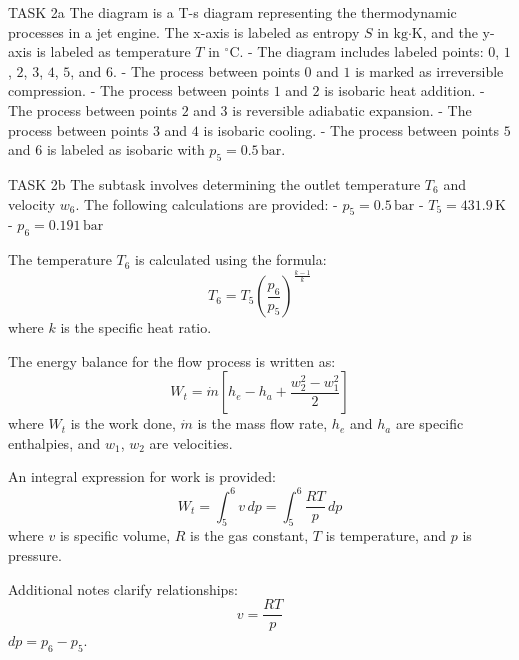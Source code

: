 TASK 2a  
The diagram is a T-s diagram representing the thermodynamic processes in a jet engine. The x-axis is labeled as entropy \( S \) in \( \text{kg·K} \), and the y-axis is labeled as temperature \( T \) in \( ^\circ\text{C} \).  
- The diagram includes labeled points: \( 0 \), \( 1 \), \( 2 \), \( 3 \), \( 4 \), \( 5 \), and \( 6 \).  
- The process between points \( 0 \) and \( 1 \) is marked as irreversible compression.  
- The process between points \( 1 \) and \( 2 \) is isobaric heat addition.  
- The process between points \( 2 \) and \( 3 \) is reversible adiabatic expansion.  
- The process between points \( 3 \) and \( 4 \) is isobaric cooling.  
- The process between points \( 5 \) and \( 6 \) is labeled as isobaric with \( p_5 = 0.5 \, \text{bar} \).  

TASK 2b  
The subtask involves determining the outlet temperature \( T_6 \) and velocity \( w_6 \).  
The following calculations are provided:  
- \( p_5 = 0.5 \, \text{bar} \)  
- \( T_5 = 431.9 \, \text{K} \)  
- \( p_6 = 0.191 \, \text{bar} \)  

The temperature \( T_6 \) is calculated using the formula:  
\[
T_6 = T_5 \left( \frac{p_6}{p_5} \right)^{\frac{k-1}{k}}
\]  
where \( k \) is the specific heat ratio.  

The energy balance for the flow process is written as:  
\[
W_t = \dot{m} \left[ h_e - h_a + \frac{w_2^2 - w_1^2}{2} \right]
\]  
where \( W_t \) is the work done, \( \dot{m} \) is the mass flow rate, \( h_e \) and \( h_a \) are specific enthalpies, and \( w_1 \), \( w_2 \) are velocities.  

An integral expression for work is provided:  
\[
W_t = \int_5^6 v \, dp = \int_5^6 \frac{R T}{p} \, dp
\]  
where \( v \) is specific volume, \( R \) is the gas constant, \( T \) is temperature, and \( p \) is pressure.  

Additional notes clarify relationships:  
\[
v = \frac{RT}{p}
\]  
\( dp = p_6 - p_5 \).